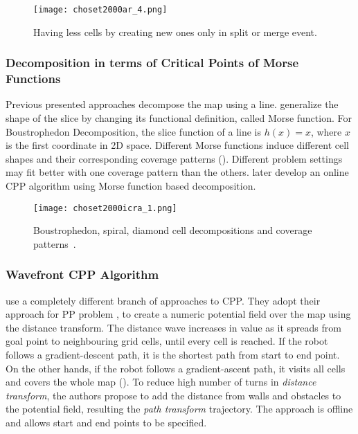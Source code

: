 \begin{figure}[!htb]
	\centering
	\texttt{[image: choset2000ar\_4.png]}
	\caption{Having less cells by creating new ones only in split or merge event.}
	\label{fig:choset2000ar_1}
\end{figure}

\subsubsection{Decomposition in terms of Critical Points of Morse Functions}
Previous presented approaches decompose the map using a line.  generalize the shape of the slice by changing its functional definition, called Morse function. For Boustrophedon Decomposition, the slice function of a line is $h(x)=x$, where $x$ is the first coordinate in 2D space. Different Morse functions induce different cell shapes and their corresponding coverage patterns (). Different problem settings may fit better with one coverage pattern than the others.  later develop an online \ac{CPP} algorithm using Morse function based decomposition.

\begin{figure}[!htb]
	\centering
	\texttt{[image: choset2000icra\_1.png]}
	\caption{Boustrophedon, spiral, diamond cell decompositions and coverage patterns~\cite{choset2000icra}.}
	\label{fig:choset2000icra_1}
\end{figure}

\subsubsection{Wavefront \ac{CPP} Algorithm}
 use a completely different branch of approaches to CPP. They adopt their approach for \ac{PP} problem \cite{zelinsky1991}, to create a numeric potential field over the map using the distance transform. The distance wave increases in value as it spreads from goal point to neighbouring grid cells, until every cell is reached. If the robot follows a gradient-descent path, it is the shortest path from start to end point. On the other hands, if the robot follows a gradient-ascent path, it visits all cells and covers the whole map (). To reduce high number of turns in \textit{distance transform}, the authors propose to add the distance from walls and obstacles to the potential field, resulting the \textit{path transform} trajectory. The approach is offline and allows start and end points to be specified.

